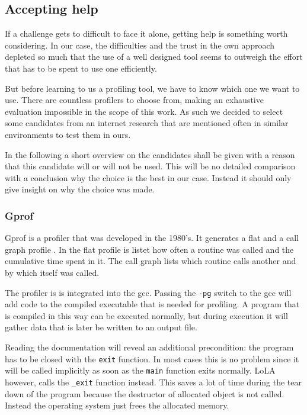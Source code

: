 \subsection{Accepting help}
If a challenge gets to difficult to face it alone, getting help is something worth considering. In our case, the difficulties and the trust in the own approach depleted so much that the use of a well designed tool seems to outweigh the effort that has to be spent to use one efficiently.

But before learning to us a profiling tool, we have to know which one we want to use. There are countless profilers to choose from, making an exhaustive evaluation impossible in the scope of this work. As such we decided to select some candidates from an internet research that are mentioned often in similar environments to test them in ours.

In the following a short overview on the candidates shall be given with a reason that this candidate will or will not be used. This will be no detailed comparison with a conclusion why the choice is the best in our case. Instead it should only give insight on why the choice was made.

\subsubsection{Gprof}
Gprof is a profiler that was developed in the 1980's. It generates a flat and a call graph profile \cite{graham1982gprof}. In the flat profile is listet how often a routine was called and the cumulative time spent in it. The call graph lists which routine calls another and by which itself was called.

The profiler is is integrated into the gcc. Passing the \texttt{-pg} switch to the gcc will add code to the compiled executable that is needed for profiling. A program that is compiled in this way can be executed normally, but during execution it will gather data that is later be written to an output file.

Reading the documentation will reveal an additional precondition: the program has to be closed with the \texttt{exit} function. In most cases this is no problem since it will be called implicitly as soon as the \texttt{main} function exits normally. LoLA however, calls the \texttt{\_exit} function instead. This saves a lot of time during the tear down of the program because the destructor of allocated object is not called. Instead the operating system just frees the allocated memory.

